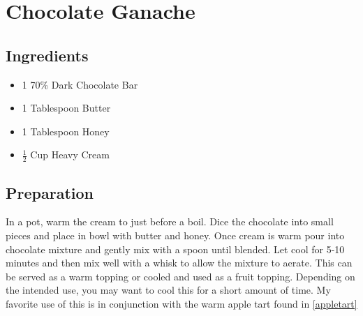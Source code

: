 \thispagestyle{fancy}
\section{Chocolate Ganache} \label{ganache}
\AddToShipoutPicture*{\Strawberries}

\subsection*{Ingredients}
\begin{multicols}{3}
	\begin{itemize}
		\item 1 70\% Dark Chocolate Bar
		\item 1 Tablespoon Butter
		\item 1 Tablespoon Honey
		\item $\frac{1}{2}$ Cup Heavy Cream
	\end{itemize}
\end{multicols}

\subsection*{Preparation}

In a pot, warm the cream to just before a boil. Dice the chocolate into small pieces and place in bowl with butter and honey. Once cream is warm pour into chocolate mixture and gently mix with a spoon until blended. Let cool for 5-10 minutes and then mix well with a whisk to allow the mixture to aerate. This can be served as a warm topping or cooled and used as a fruit topping. Depending on the intended use, you may want to cool this for a short amount of time. My favorite use of this is in conjunction with the warm apple tart found in \ref{appletart}